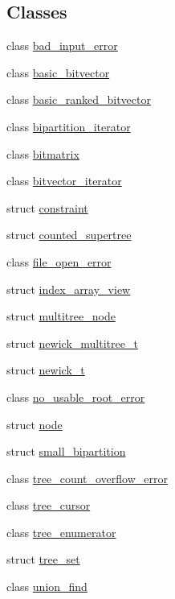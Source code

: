 \subsection*{Classes}
\begin{DoxyCompactItemize}
\item 
class \hyperlink{classterraces_1_1bad__input__error}{bad\+\_\+input\+\_\+error}
\item 
class \hyperlink{classterraces_1_1basic__bitvector}{basic\+\_\+bitvector}
\item 
class \hyperlink{classterraces_1_1basic__ranked__bitvector}{basic\+\_\+ranked\+\_\+bitvector}
\item 
class \hyperlink{classterraces_1_1bipartition__iterator}{bipartition\+\_\+iterator}
\item 
class \hyperlink{classterraces_1_1bitmatrix}{bitmatrix}
\item 
class \hyperlink{classterraces_1_1bitvector__iterator}{bitvector\+\_\+iterator}
\item 
struct \hyperlink{structterraces_1_1constraint}{constraint}
\item 
struct \hyperlink{structterraces_1_1counted__supertree}{counted\+\_\+supertree}
\item 
class \hyperlink{classterraces_1_1file__open__error}{file\+\_\+open\+\_\+error}
\item 
struct \hyperlink{structterraces_1_1index__array__view}{index\+\_\+array\+\_\+view}
\item 
struct \hyperlink{structterraces_1_1multitree__node}{multitree\+\_\+node}
\item 
struct \hyperlink{structterraces_1_1newick__multitree__t}{newick\+\_\+multitree\+\_\+t}
\item 
struct \hyperlink{structterraces_1_1newick__t}{newick\+\_\+t}
\item 
class \hyperlink{classterraces_1_1no__usable__root__error}{no\+\_\+usable\+\_\+root\+\_\+error}
\item 
struct \hyperlink{structterraces_1_1node}{node}
\item 
struct \hyperlink{structterraces_1_1small__bipartition}{small\+\_\+bipartition}
\item 
class \hyperlink{classterraces_1_1tree__count__overflow__error}{tree\+\_\+count\+\_\+overflow\+\_\+error}
\item 
class \hyperlink{classterraces_1_1tree__cursor}{tree\+\_\+cursor}
\item 
class \hyperlink{classterraces_1_1tree__enumerator}{tree\+\_\+enumerator}
\item 
struct \hyperlink{structterraces_1_1tree__set}{tree\+\_\+set}
\item 
class \hyperlink{classterraces_1_1union__find}{union\+\_\+find}
\end{DoxyCompactItemize}
